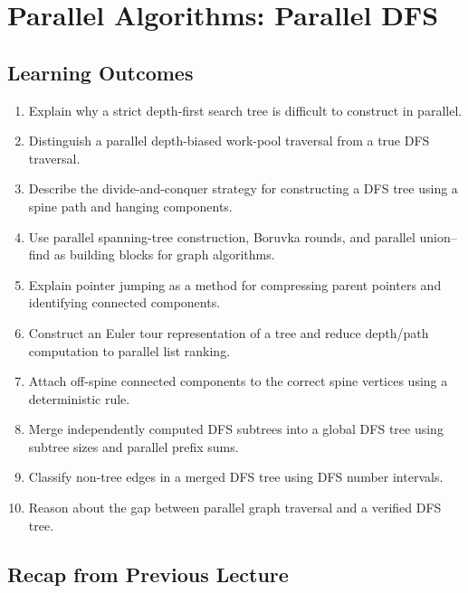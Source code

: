 \chapter{Parallel Algorithms: Parallel DFS}
\label{ch:parallel-algorithms}

\section*{Learning Outcomes}

\begin{enumerate}
    \item Explain why a strict depth-first search tree is difficult to construct in parallel.
    \item Distinguish a parallel depth-biased work-pool traversal from a true DFS traversal.
    \item Describe the divide-and-conquer strategy for constructing a DFS tree using a spine path and hanging components.
    \item Use parallel spanning-tree construction, Boruvka rounds, and parallel union--find as building blocks for graph algorithms.
    \item Explain pointer jumping as a method for compressing parent pointers and identifying connected components.
    \item Construct an Euler tour representation of a tree and reduce depth/path computation to parallel list ranking.
    \item Attach off-spine connected components to the correct spine vertices using a deterministic rule.
    \item Merge independently computed DFS subtrees into a global DFS tree using subtree sizes and parallel prefix sums.
    \item Classify non-tree edges in a merged DFS tree using DFS number intervals.
    \item Reason about the gap between parallel graph traversal and a verified DFS tree.
\end{enumerate}

\section*{Recap from Previous Lecture}

